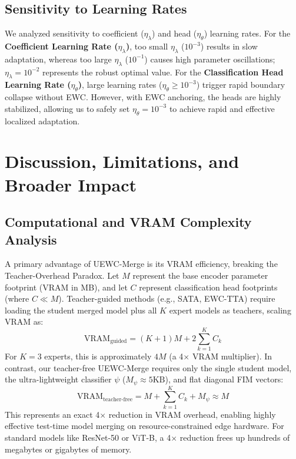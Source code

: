 \documentclass{article}
\theoremstyle{plain}
\theoremstyle{definition}
\theoremstyle{remark}
\begin{document}
\subsection{Sensitivity to Learning Rates}
We analyzed sensitivity to coefficient ($\eta_{\lambda}$) and head ($\eta_{\theta}$) learning rates. For the \textbf{Coefficient Learning Rate ($\eta_{\lambda}$)}, too small $\eta_{\lambda}$ ($10^{-3}$) results in slow adaptation, whereas too large $\eta_{\lambda}$ ($10^{-1}$) causes high parameter oscillations; $\eta_{\lambda} = 10^{-2}$ represents the robust optimal value. For the \textbf{Classification Head Learning Rate ($\eta_{\theta}$)}, large learning rates ($\eta_{\theta} \ge 10^{-3}$) trigger rapid boundary collapse without EWC. However, with EWC anchoring, the heads are highly stabilized, allowing us to safely set $\eta_{\theta} = 10^{-3}$ to achieve rapid and effective localized adaptation.

\section{Discussion, Limitations, and Broader Impact}
\subsection{Computational and VRAM Complexity Analysis}
A primary advantage of UEWC-Merge is its VRAM efficiency, breaking the Teacher-Overhead Paradox. Let $M$ represent the base encoder parameter footprint (VRAM in MB), and let $C$ represent classification head footprints (where $C \ll M$). Teacher-guided methods (e.g., SATA, EWC-TTA) require loading the student merged model plus all $K$ expert models as teachers, scaling VRAM as:
\begin{equation}
    \text{VRAM}_{\text{guided}} = (K + 1)M + 2 \sum_{k=1}^K C_k
\end{equation}
For $K=3$ experts, this is approximately $4M$ (a 4$\times$ VRAM multiplier). In contrast, our teacher-free UEWC-Merge requires only the single student model, the ultra-lightweight classifier $\psi$ ($M_{\psi} \approx 5\text{KB}$), and flat diagonal FIM vectors:
\begin{equation}
    \text{VRAM}_{\text{teacher-free}} = M + \sum_{k=1}^K C_k + M_{\psi} \approx M
\end{equation}
This represents an exact 4$\times$ reduction in VRAM overhead, enabling highly effective test-time model merging on resource-constrained edge hardware. For standard models like ResNet-50 or ViT-B, a 4$\times$ reduction frees up hundreds of megabytes or gigabytes of memory.
\end{document}
